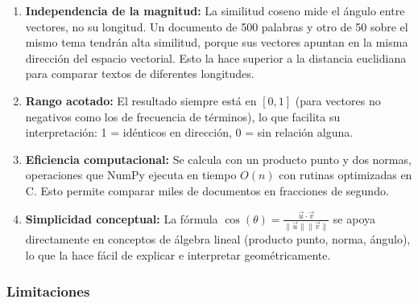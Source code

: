 \begin{enumerate}
    \item \textbf{Independencia de la magnitud:} La similitud coseno mide el ángulo entre vectores, no su longitud. Un documento de 500 palabras y otro de 50 sobre el mismo tema tendrán alta similitud, porque sus vectores apuntan en la misma dirección del espacio vectorial. Esto la hace superior a la distancia euclidiana para comparar textos de diferentes longitudes.

    \item \textbf{Rango acotado:} El resultado siempre está en $[0, 1]$ (para vectores no negativos como los de frecuencia de términos), lo que facilita su interpretación: 1 = idénticos en dirección, 0 = sin relación alguna.

    \item \textbf{Eficiencia computacional:} Se calcula con un producto punto y dos normas, operaciones que NumPy ejecuta en tiempo $O(n)$ con rutinas optimizadas en C. Esto permite comparar miles de documentos en fracciones de segundo.

    \item \textbf{Simplicidad conceptual:} La fórmula $\cos(\theta) = \frac{\vec{u} \cdot \vec{v}}{\|\vec{u}\| \|\vec{v}\|}$ se apoya directamente en conceptos de álgebra lineal (producto punto, norma, ángulo), lo que la hace fácil de explicar e interpretar geométricamente.
\end{enumerate}

\subsubsection{Limitaciones}

